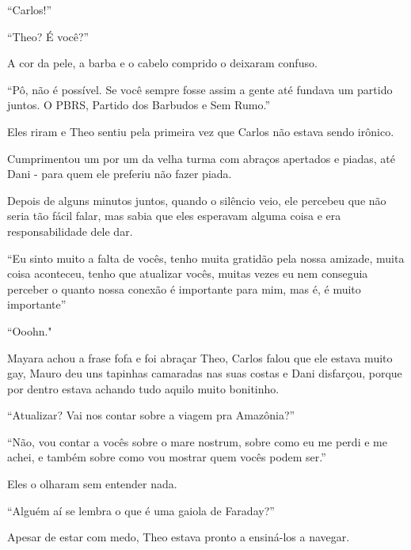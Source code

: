 ``Carlos!''

``Theo? É você?''

A cor da pele, a barba e o cabelo comprido o deixaram confuso.

``Pô, não é possível. Se você sempre fosse assim a gente até fundava um
partido juntos. O PBRS, Partido dos Barbudos e Sem Rumo.''

Eles riram e Theo sentiu pela primeira vez que Carlos não estava sendo
irônico.

Cumprimentou um por um da velha turma com abraços apertados e piadas,
até Dani - para quem ele preferiu não fazer piada.

Depois de alguns minutos juntos, quando o silêncio veio, ele percebeu
que não seria tão fácil falar, mas sabia que eles esperavam alguma coisa
e era responsabilidade dele dar.

``Eu sinto muito a falta de vocês, tenho muita gratidão pela nossa
amizade, muita coisa aconteceu, tenho que atualizar vocês, muitas vezes
eu nem conseguia perceber o quanto nossa conexão é importante para mim,
mas é, é muito importante''

``Ooohn."

Mayara achou a frase fofa e foi abraçar Theo, Carlos falou que ele
estava muito gay, Mauro deu uns tapinhas camaradas nas suas costas e
Dani disfarçou, porque por dentro estava achando tudo aquilo muito
bonitinho.

``Atualizar? Vai nos contar sobre a viagem pra Amazônia?''

``Não, vou contar a vocês sobre o mare nostrum, sobre como eu me perdi e
me achei, e também sobre como vou mostrar quem vocês podem ser.''

Eles o olharam sem entender nada.

``Alguém aí se lembra o que é uma gaiola de Faraday?''

Apesar de estar com medo, Theo estava pronto a ensiná-los a navegar.

\asterisc
